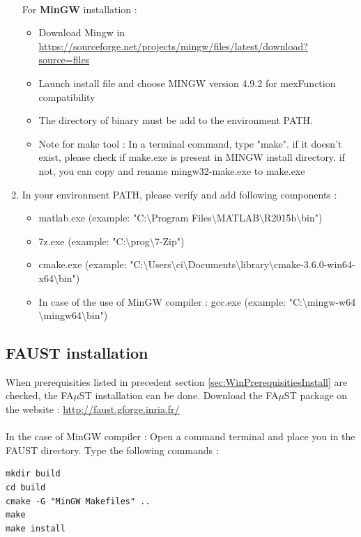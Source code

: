 \begin{enumerate}
\paragraph{}For \textbf{MinGW} installation :
\begin{itemize}
\item Download Mingw in \url{https://sourceforge.net/projects/mingw/files/latest/download?source=files}
\item Launch install file and choose MINGW version 4.9.2 for mexFunction compatibility 
\item The directory of binary must be add to the environment PATH. 

\item Note for make tool : In a terminal command, type "make". if it doesn't exist, please check if make.exe is present in MINGW install directory. if not, you can copy and rename mingw32-make.exe to make.exe
\end{itemize}



\item In your environment PATH, please verify and add following components :

\begin{itemize}
\item matlab.exe (example: "C:$\setminus$Program Files$\setminus$MATLAB$\setminus$R2015b$\setminus$bin")
\item 7z.exe (example: "C:$\setminus$prog$\setminus$7-Zip")
\item cmake.exe (example: "C:$\setminus$Users$\setminus$ci$\setminus$Documents$\setminus$library$\setminus$cmake-3.6.0-win64-x64$\setminus$bin")
\item In case of the use of MinGW compiler : gcc.exe (example: "C:$\setminus$mingw-w64$\setminus$mingw64$\setminus$bin")
\end{itemize}
\end{enumerate}


\subsection{FAUST installation}\label{sec:WinFaustInstall}
When prerequisities listed in precedent section \ref{sec:WinPrerequisitiesInstall} are checked, the FA$\mu$ST installation can be done. 
Download the FA$\mu$ST package on the website :  \url{http://faust.gforge.inria.fr/}


\paragraph{}In the case of MinGW compiler :
Open a command terminal and place you in the FAUST directory. Type the following commands : 
\begin{lstlisting}
mkdir build
cd build
cmake -G "MinGW Makefiles" .. 
make
make install
\end{lstlisting}


